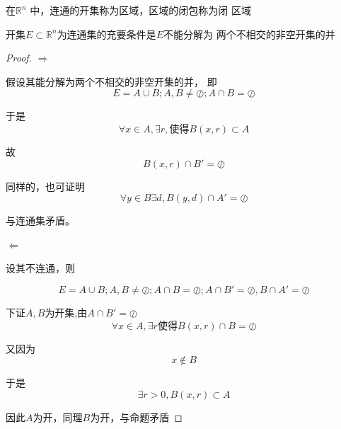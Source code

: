 \documentclass[lang=cn,10pt]{elegantbook}
\begin{document}
\begin{definition}
	在$ \mathbb{R} ^n$ 中，连通的开集称为区域，区域的闭包称为闭
	区域
\end{definition}
\begin{theorem}
	开集$E\subset  \mathbb{R} ^n$为连通集的充要条件是$E $不能分解为
	两个不相交的非空开集的并
\end{theorem}
\begin{proof}
	$\Rightarrow$
	
	假设其能分解为两个不相交的非空开集的并，
	即
	\begin{equation*}
		E=A\cup B; A,B\ne \oslash ;A\cap B=\oslash 
	\end{equation*}
	
	于是
	\begin{equation*}
		\forall x\in A,\exists r,\text{使得}B\left( x,r \right) \subset A
	\end{equation*}
	
	故
	\begin{equation*}
		B\left( x,r \right)\cap B'=\oslash
	\end{equation*}
	
	同样的，也可证明
	\begin{equation*}
		\forall y \in B \exists d, B\left( y,d \right)\cap A'=\oslash
	\end{equation*}
	
	与连通集矛盾。
	
	$\Leftarrow$
	
	设其不连通，则
	
	\begin{equation*}
		E=A\cup B;A,B\ne \oslash ;A\cap B=\oslash ;A\cap B'=\oslash,B\cap A'=\oslash
	\end{equation*}
	
	下证$A,B$为开集,由$A\cap B'=\oslash$
	\begin{equation*}
		\forall x \in A ,\exists r \text{使得}B(x,r)\cap B=\oslash
	\end{equation*}
	
	又因为
	\begin{equation*}
		x\notin B
	\end{equation*}
	
	于是
	\begin{equation*}
		\exists r>0,B(x,r)\subset A
	\end{equation*}
	
	因此$A$为开，同理$B$为开，与命题矛盾
\end{proof}
\end{document}
